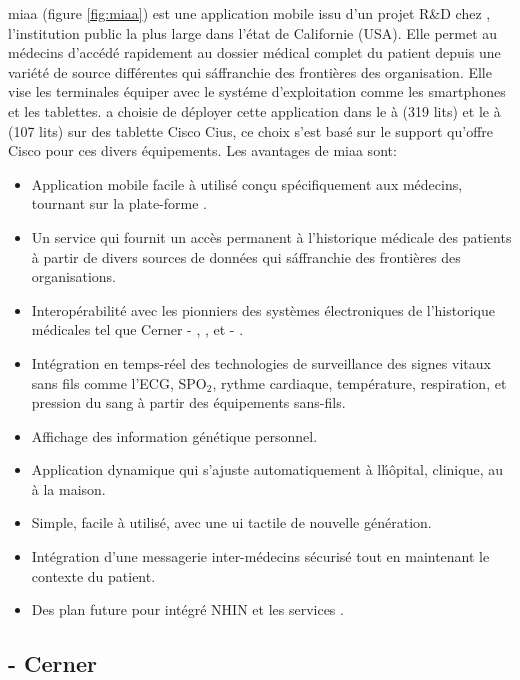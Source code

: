 \gls{miaa} (figure \ref{fig:miaa}) est une application mobile issu d'un
projet R\&D chez , l'institution public la
plus large dans l'état de Californie (USA). Elle permet au médecins
d'accédé rapidement au dossier médical complet du patient depuis une
variété de source différentes qui s\'affranchie des frontières des
organisation\cite{pph:eweek}. Elle vise les terminales équiper avec
le systéme d'exploitation \android{} comme les smartphones et les
tablettes.  a choisie de déployer cette
application dans le  à 
(319 lits) et le  à  (107 lits) sur
des tablette Cisco Cius\cite{pph:tabtimes}, ce choix s'est basé sur le
support qu'offre Cisco pour ces divers équipements.
Les avantages de \gls{miaa} sont:~\cite{pph:yahoo}
\begin{itemize}
\item Application mobile facile à utilisé conçu spécifiquement aux
médecins, tournant sur la plate-forme \android{}.
\item Un service  qui fournit un accès permanent à
l'historique médicale des patients à partir de divers sources de
données qui s\'affranchie des frontières des organisations.
\item Interopérabilité avec les pionniers des systèmes électroniques
de l'historique médicales tel que Cerner - ,
, et  - .
\item Intégration en temps-réel des technologies de surveillance
des signes vitaux sans fils comme l'ECG, SPO$_{2}$, rythme cardiaque,
température, respiration, et pression du sang à partir des équipements
sans-fils.
\item Affichage des information génétique personnel.
\item Application dynamique qui s'ajuste automatiquement à l\'hôpital,
clinique, au à la maison.
\item Simple, facile à utilisé, avec une \gls{ui} tactile
de nouvelle génération.
\item Intégration d'une messagerie inter-médecins sécurisé tout en
maintenant le contexte du patient.
\item Des plan future pour intégré NHIN  et les services
.
\end{itemize}

\subsection{\pct{} - Cerner}

